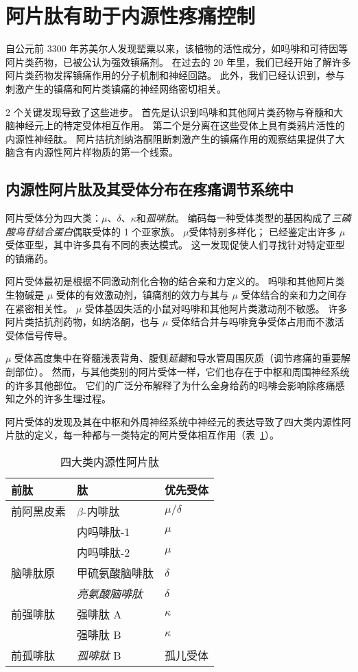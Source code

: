 \section{阿片肽有助于内源性疼痛控制}

自公元前 3300 年苏美尔人发现罂粟以来，该植物的活性成分，如吗啡和可待因等阿片类药物，已被公认为强效镇痛剂。
在过去的 20 年里，我们已经开始了解许多阿片类药物发挥镇痛作用的分子机制和神经回路。
此外，我们已经认识到，参与刺激产生的镇痛和阿片类镇痛的神经网络密切相关。


2 个关键发现导致了这些进步。
首先是认识到吗啡和其他阿片类药物与脊髓和大脑神经元上的特定受体相互作用。
第二个是分离在这些受体上具有类鸦片活性的内源性神经肽。
阿片拮抗剂纳洛酮阻断刺激产生的镇痛作用的观察结果提供了大脑含有内源性阿片样物质的第一个线索。



\subsection{内源性阿片肽及其受体分布在疼痛调节系统中}

阿片受体分为四大类：$\mu$、$ \delta $、$ \kappa $和\textit{孤啡肽}。
编码每一种受体类型的基因构成了\textit{三磷酸鸟苷结合蛋白}偶联受体的 1 个亚家族。
$\mu$受体特别多样化；
已经鉴定出许多 $\mu$ 受体亚型，其中许多具有不同的表达模式。
这一发现促使人们寻找针对特定亚型的镇痛药。


阿片受体最初是根据不同激动剂化合物的结合亲和力定义的。
吗啡和其他阿片类生物碱是 $\mu$ 受体的有效激动剂，镇痛剂的效力与其与 $\mu$ 受体结合的亲和力之间存在紧密相关性。
$\mu$ 受体基因失活的小鼠对吗啡和其他阿片类激动剂不敏感。
许多阿片类拮抗剂药物，如纳洛酮，也与 $\mu$ 受体结合并与吗啡竞争受体占用而不激活受体信号传导。


$\mu$ 受体高度集中在脊髓浅表背角、腹侧\textit{延髓}和导水管周围灰质（调节疼痛的重要解剖部位）。
然而，与其他类别的阿片受体一样，它们也存在于中枢和周围神经系统的许多其他部位。
它们的广泛分布解释了为什么全身给药的吗啡会影响除疼痛感知之外的许多生理过程。


阿片受体的发现及其在中枢和外周神经系统中神经元的表达导致了四大类内源性阿片肽的定义，每一种都与一类特定的阿片受体相互作用（表~\ref{tab:20_1}）。


\begin{table}[htbp]
	\caption{四大类内源性阿片肽} \label{tab:20_1} \centering
	\begin{tabular}{lll}
		\toprule
		前肽 & 肽 & 优先受体 \\
		\midrule
		前阿黑皮素 & $\beta$-内啡肽 & $\mu / \delta$  \\
		 & 内吗啡肽-1 & $\mu$  \\
		 & 内吗啡肽-2 & $\mu$  \\
		脑啡肽原 & 甲硫氨酸脑啡肽 & $\delta$  \\
		 & \textit{亮氨酸脑啡肽} & $\delta$  \\
		前强啡肽 & 强啡肽 A & $\kappa$  \\
		 & 强啡肽 B & $\kappa$  \\
		前孤啡肽 & \textit{孤啡肽} B & 孤儿受体  \\
		\bottomrule
	\end{tabular}
\end{table}


